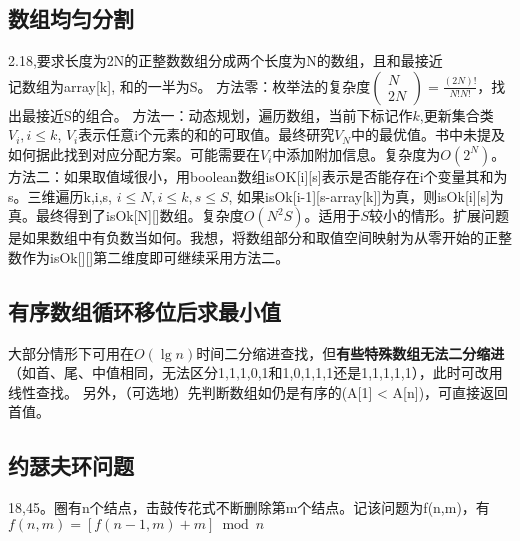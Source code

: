 \subsection{数组均匀分割}
\cite{bop}2.18,要求长度为2N的正整数数组分成两个长度为N的数组，且和最接近\\记数组为array[k], 和的一半为S。
方法零：枚举法的复杂度$\left( \begin{array}{c} N \\ 2N \end{array} \right) = \frac{(2N)!}{N!N!}$，找出最接近S的组合。
    方法一：动态规划，遍历数组，当前下标记作$k$,更新集合类$V_i,i \le k$, $V_i$表示任意i个元素的和的可取值。最终研究$V_N$中的最优值。书中未提及如何据此找到对应分配方案。可能需要在$V_i$中添加附加信息。复杂度为$O(2^N)$。
方法二：如果取值域很小，用boolean数组isOK[i][s]表示是否能存在i个变量其和为s。三维遍历k,i,s, $i \le N,i \le k, s \le S$, 如果isOk[i-1][s-array[k]]为真，则isOk[i][s]为真。最终得到了isOk[N][]数组。复杂度$O(N^2 S)$。适用于$S$较小的情形。扩展问题是如果数组中有负数当如何。我想，将数组部分和取值空间映射为从零开始的正整数作为isOk[][]第二维度即可继续采用方法二。

\subsection{有序数组循环移位后求最小值}

大部分情形下可用在$O(\lg n)$时间二分缩进查找，但\textbf{有些特殊数组无法二分缩进}（如首、尾、中值相同，无法区分{1,1,1,0,1}和{1,0,1,1,1}还是{1,1,1,1,1}），此时可改用线性查找。
另外，（可选地）先判断数组如仍是有序的(A[1] < A[n])，可直接返回首值。


\subsection{约瑟夫环问题}
\cite{ms100}18,\cite{sword}45。圈有n个结点，击鼓传花式不断删除第m个结点。记该问题为f(n,m)，有 $f(n,m)=[f(n-1,m)+m]\bmod n$

